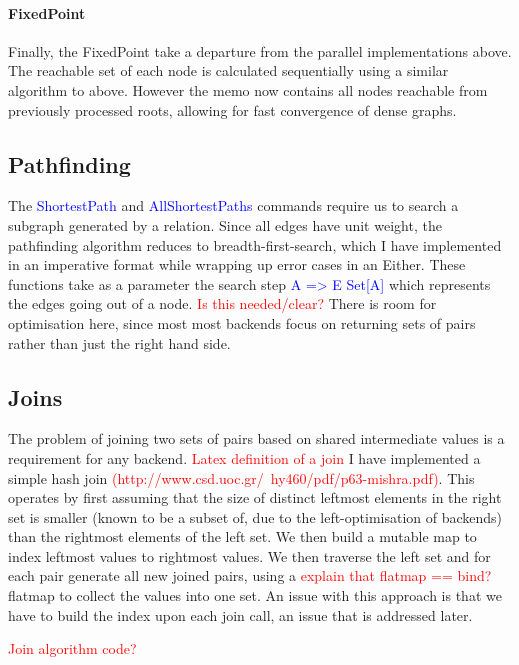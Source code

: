 \documentclass[12pt,a4paper,twoside,openright]{report}
\newcommand\todo[1]{\textcolor{red}{#1}}
\newcommand\codeName[1]{\textcolor{blue}{#1}}
\begin{document}
		\paragraph{FixedPoint}
Finally, the FixedPoint take a departure from the parallel implementations above. The reachable set of each node is calculated sequentially using a similar algorithm to above. However the memo now contains all nodes reachable from previously processed roots, allowing for fast convergence of dense graphs.	
	
	\subsection{Pathfinding}
	The \codeName{ShortestPath} and \codeName{AllShortestPaths} commands require us to search a subgraph generated by a relation. Since all edges have unit weight, the pathfinding algorithm reduces to breadth-first-search, which I have implemented in an imperative format while wrapping up error cases in an Either. These functions take as a parameter the search step \codeName{A => E \/ Set[A]} which represents the edges going out of a node.  \todo{Is this needed/clear?} There is room for optimisation here, since most most backends focus on returning sets of pairs rather than just the right hand side.
	\subsection{Joins}
	The problem of joining two sets of pairs based on shared intermediate values is a requirement for any backend. \todo{Latex definition of a join}  I have implemented a simple hash join \todo{(http://www.csd.uoc.gr/~hy460/pdf/p63-mishra.pdf)}. This operates by first assuming that the size of distinct leftmost elements in the right set is smaller (known to be a subset of, due to the left-optimisation of backends) than the rightmost elements of the left set. We then build a mutable map to index leftmost values to rightmost values. We then traverse the left set and for each pair generate all new joined pairs, using a \todo{explain that flatmap == bind?} flatmap to collect the values into one set. An issue with this approach is that we have to build the index upon each join call, an issue that is addressed later.
	
	\todo{Join algorithm code?}
	
\end{document}
